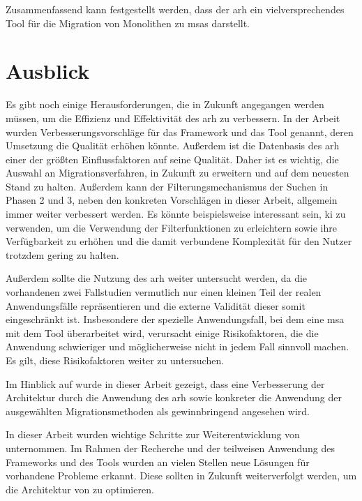 Zusammenfassend kann festgestellt werden, dass der \gls{arh} ein vielversprechendes Tool für die Migration von Monolithen zu \glspl{msa} darstellt.

\section{Ausblick}

Es gibt noch einige Herausforderungen, die in Zukunft angegangen werden müssen, um die Effizienz und Effektivität des \gls{arh} zu verbessern.
In der Arbeit wurden Verbesserungsvorschläge für das Framework und das Tool genannt, deren Umsetzung die Qualität erhöhen könnte.
Außerdem ist die Datenbasis des \gls{arh} einer der größten Einflussfaktoren auf seine Qualität.
Daher ist es wichtig, die Auswahl an Migrationsverfahren, \bpp in Zukunft zu erweitern und auf dem neuesten Stand zu halten.
Außerdem kann der Filterungsmechanismus der Suchen in Phasen 2 und 3, neben den konkreten Vorschlägen in dieser Arbeit, allgemein immer weiter verbessert werden.
Es könnte beispielsweise interessant sein, \gls{ki} zu verwenden, um die Verwendung der Filterfunktionen zu erleichtern sowie ihre Verfügbarkeit zu erhöhen und die damit verbundene Komplexität für den Nutzer trotzdem gering zu halten.

Außerdem sollte die Nutzung des \gls{arh} weiter untersucht werden, da die vorhandenen zwei Fallstudien vermutlich nur einen kleinen Teil der realen Anwendungsfälle repräsentieren und die externe Validität dieser somit eingeschränkt ist.
Insbesondere der spezielle Anwendungsfall, bei dem eine \gls{msa} mit dem Tool überarbeitet wird, verursacht einige Risikofaktoren, die die Anwendung schwieriger und möglicherweise nicht in jedem Fall sinnvoll machen.
Es gilt, diese Risikofaktoren weiter zu untersuchen.

Im Hinblick auf \jf wurde in dieser Arbeit gezeigt, dass eine Verbesserung der Ar\-chi\-tek\-tur durch die Anwendung des \gls{arh} sowie konkreter die Anwendung der ausgewählten Migrationsmethoden als gewinnbringend angesehen wird.

In dieser Arbeit wurden wichtige Schritte zur Weiterentwicklung von \jf unternommen.
Im Rahmen der Recherche und der teilweisen Anwendung des Frameworks und des Tools wurden an vielen Stellen neue Lösungen für vorhandene Probleme erkannt.
Diese sollten in Zukunft weiterverfolgt werden, um die Architektur von \jf zu optimieren.

